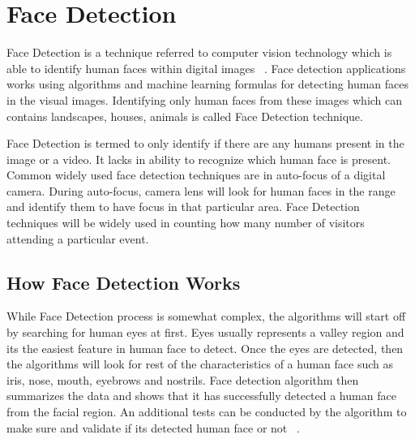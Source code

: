 \documentclass[sigconf]{acmart}
\begin{document}
\section{Face Detection}
Face Detection is a technique referred to computer vision technology which is able to identify human faces within digital images ~\cite{Divya2013}. Face detection applications works using algorithms and machine learning formulas for detecting human faces in the visual images. Identifying only human faces from these images which can contains landscapes, houses, animals is called Face Detection technique.

Face Detection is termed to only identify if there are any humans present in the image or a video. It lacks in ability to recognize which human face is present. Common widely used face detection techniques are in auto-focus of a digital camera. During auto-focus, camera lens will look for human faces in the range and identify them to have focus in that particular area.
Face Detection techniques will be widely used in counting how many number of visitors attending a particular event.

\subsection{How Face Detection Works}
While Face Detection process is somewhat complex, the algorithms will start off by searching for human eyes at first. Eyes usually represents a valley region and its the easiest feature in human face to detect. Once the eyes are detected, then the algorithms will look for rest of the characteristics of a human face such as iris, nose, mouth, eyebrows and nostrils. Face detection algorithm then summarizes the data and shows that it has successfully detected a human face from the facial region. An additional tests can be conducted by the algorithm to make sure and validate if its detected human face or not ~\cite{Jesse2017}.
\end{document}
